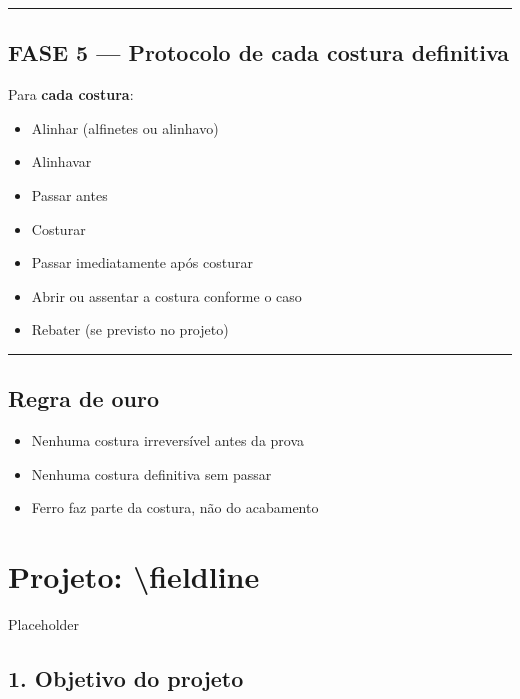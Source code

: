 \documentclass[
  brazilian,
  8pt,
  oneside]{book}
\providecommand{\tightlist}{%
  \setlength{\itemsep}{0pt}\setlength{\parskip}{0pt}}
\begin{document}
\begin{center}\rule{0.5\linewidth}{0.5pt}\end{center}

\section{FASE 5 --- Protocolo de cada costura definitiva}\label{fase-5-protocolo-de-cada-costura-definitiva}

Para \textbf{cada costura}:

\begin{itemize}
\tightlist
\item[$\square$]
  Alinhar (alfinetes ou alinhavo)
\item[$\square$]
  Alinhavar
\item[$\square$]
  Passar antes
\item[$\square$]
  Costurar
\item[$\square$]
  Passar imediatamente após costurar
\item[$\square$]
  Abrir ou assentar a costura conforme o caso
\item[$\square$]
  Rebater (se previsto no projeto)
\end{itemize}

\begin{center}\rule{0.5\linewidth}{0.5pt}\end{center}

\section{Regra de ouro}\label{regra-de-ouro}

\begin{itemize}
\tightlist
\item[$\square$]
  Nenhuma costura irreversível antes da prova
\item[$\square$]
  Nenhuma costura definitiva sem passar
\item[$\square$]
  Ferro faz parte da costura, não do acabamento
\end{itemize}

\chapter{Projeto: \textbackslash fieldline}\label{projeto-fieldline}

Placeholder

\section{1. Objetivo do projeto}\label{objetivo-do-projeto}
\end{document}
